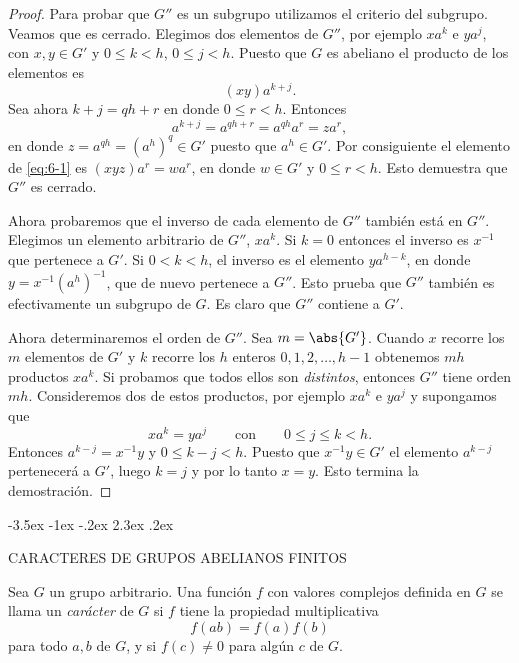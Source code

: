\documentclass[12pt,a4paper]{book}
\makeatletter
\renewcommand\section{\@startsection{section}{1}{\z@}%
  {-3.5ex \@plus -1ex \@minus -.2ex}%
  {2.3ex \@plus .2ex}%
  {\normalfont\Large\bfseries\raggedright}}
\makeatother
\begin{document}
    \begin{proof}
        Para probar que $G''$ es un subgrupo utilizamos el criterio del subgrupo. Veamos
        que es cerrado. Elegimos dos elementos de $G''$, por ejemplo $xa^{k}$ e $ya^{j}$, con
        $x,y\in G'$ y $0\leq k<h$, $0\leq j<h$. Puesto que $G$ es abeliano el producto de
        los elementos es
        \begin{equation}\label{eq:6-1}
            (xy)a^{k+j}.
        \end{equation}
        Sea ahora $k+j=qh+r$ en donde $0\leq r<h$. Entonces
        \begin{equation*}
            a^{k+j}=a^{qh+r}=a^{qh}a^{r}=za^{r},
        \end{equation*}
        en donde $z=a^{qh}=(a^{h})^{q}\in G'$ puesto que $a^{h}\in G'$. Por consiguiente el
        elemento de \eqref{eq:6-1} es $(xyz)a^{r}=wa^{r}$, en donde $w\in G'$ y $0\leq r<h$.
        Esto demuestra que $G''$ es cerrado.

        Ahora probaremos que el inverso de cada elemento de $G''$ también está en $G''$.
        Elegimos un elemento arbitrario de $G''$, $xa^{k}$. Si $k=0$ entonces el inverso es
        $x^{-1}$ que pertenece a $G'$. Si $0<k<h$, el inverso es el elemento
        $ya^{h-k}$, en donde $y=x^{-1}(a^{h})^{-1}$, que de nuevo pertenece a $G''$. Esto
        prueba que $G''$ también es efectivamente un subgrupo de $G$. Es claro que $G''$
        contiene a $G'$.

        Ahora determinaremos el orden de $G''$. Sea $m=\abs{G'}$. Cuando $x$ recorre los
        $m$ elementos de $G'$ y $k$ recorre los $h$ enteros $0,1,2,\dots,h-1$ obtenemos
        $mh$ productos $xa^{k}$. Si probamos que todos ellos son \textit{distintos},
        entonces $G''$ tiene orden $mh$. Consideremos dos de estos productos, por ejemplo
        $xa^{k}$ e $ya^{j}$ y supongamos que
        \begin{equation*}
            xa^{k}=ya^{j}\qquad\text{con}\qquad0\leq j\leq k<h.
        \end{equation*}
        Entonces $a^{k-j}=x^{-1}y$ y $0\leq k-j<h$. Puesto que $x^{-1}y\in G'$ el elemento
        $a^{k-j}$ pertenecerá a $G'$, luego $k=j$ y por lo tanto $x=y$. Esto termina la
        demostración.
    \end{proof}

    \section{CARACTERES DE GRUPOS ABELIANOS FINITOS}
    \begin{definicion}
        Sea $G$ un grupo arbitrario. Una función $f$ con valores complejos definida en $G$
        se llama un \textit{carácter} de $G$ si $f$ tiene la propiedad multiplicativa
        \begin{equation*}
            f(ab)=f(a)f(b)
        \end{equation*}
        para todo $a,b$ de $G$, y si $f(c)\neq0$ para algún $c$ de $G$.
    \end{definicion}
\end{document}

